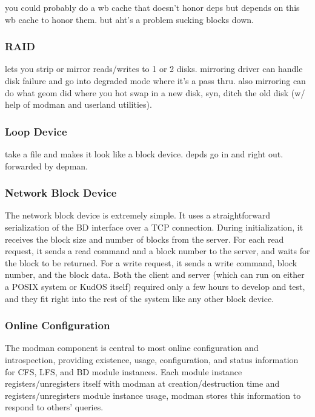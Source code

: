 you could probably do a wb cache that doesn't honor deps but depends
on this wb cache to honor them. but aht's a problem sucking blocks
down.

\subsubsection{RAID}
\label{sec:solution:impl:raid}

lets you strip or mirror reads/writes to 1 or 2 disks. mirroring
driver can handle disk failure and go into degraded mode where it's a
pass thru. also mirroring can do what geom did where you hot swap in a
new disk, syn, ditch the old disk (w/ help of modman and userland
utilities).

\subsubsection{Loop Device}
\label{sec:solution:impl:loop}

take a file and makes it look like a block device. depds go in and
right out. forwarded by depman.

\subsubsection{Network Block Device}

The network block device is extremely simple. It uses a straightforward
serialization of the BD interface over a TCP connection. During initialization,
it receives the block size and number of blocks from the server. For each read
request, it sends a read command and a block number to the server, and waits for
the block to be returned. For a write request, it sends a write command, block
number, and the block data. Both the client and server (which can run on either
a POSIX system or KudOS itself) required only a few hours to develop and test,
and they fit right into the rest of the system like any other block device.

\subsubsection{Online Configuration}
\label{sec:solution:impl:online}

The modman component is central to most online configuration and
introspection, providing existence, usage, configuration, and status
information for CFS, LFS, and BD module instances. Each module instance
registers/unregisters itself with modman at creation/destruction time
and registers/unregisters module instance usage, modman stores this
information to respond to others' queries.

